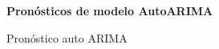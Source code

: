 %
\begin{figure}[h]
	\centering
	\textbf{Pronósticos de modelo AutoARIMA}\par\medskip
	\caption{Pronóstico auto ARIMA}\label{fig26}
\end{figure}

